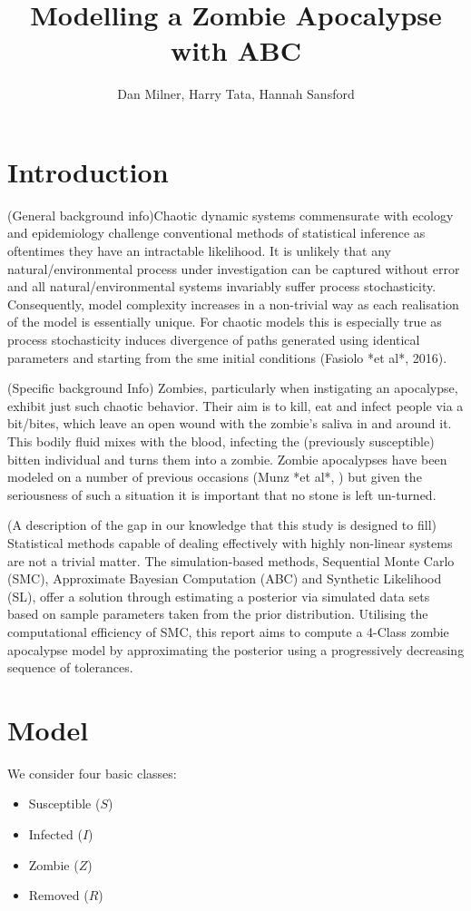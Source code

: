 \documentclass[]{article}
\title{Modelling a Zombie Apocalypse with ABC}
\author{Dan Milner, Harry Tata, Hannah Sansford}
\begin{document}
	
	\maketitle
	
	\section{Introduction}
	
	(General background info)Chaotic dynamic systems commensurate with ecology and epidemiology challenge conventional methods of statistical inference as oftentimes they have an intractable likelihood. It is unlikely that any natural/environmental process under investigation can be captured without error and all natural/environmental systems invariably suffer process stochasticity. Consequently, model complexity increases in a non-trivial way as each realisation of the model is essentially unique. For chaotic models this is especially true as process stochasticity induces divergence of paths generated using identical parameters and starting from the sme initial conditions (Fasiolo *et al*, 2016).
	
	(Specific background Info) Zombies, particularly when instigating an apocalypse, exhibit just such chaotic behavior. Their aim is to kill, eat and infect people via a bit/bites, which leave an open wound with the zombie's saliva in and around it. This bodily fluid mixes with the blood, infecting the (previously susceptible) bitten individual and turns them into a zombie. Zombie apocalypses have been modeled on a number of previous occasions (Munz *et al*, ) but given the seriousness of such a situation it is important that no stone is left un-turned. 
	
	(A description of the gap in our knowledge that this study is designed to fill) Statistical methods capable of dealing effectively with highly non-linear systems are not a trivial matter. The simulation-based methods, Sequential Monte Carlo (SMC), Approximate Bayesian Computation (ABC) and Synthetic Likelihood (SL), offer a solution through estimating a posterior via simulated data sets based on sample parameters taken from the prior distribution. Utilising the computational efficiency of SMC, this report aims to compute a 4-Class zombie apocalypse model by approximating the posterior using a progressively decreasing sequence of tolerances. 
	
	
	\section{Model}
	We consider four basic classes:
	\begin{itemize}
		\item Susceptible ($S$)
		\item Infected ($I$)
		\item Zombie ($Z$)
		\item Removed ($R$)
	\end{itemize}
	
\end{document}
